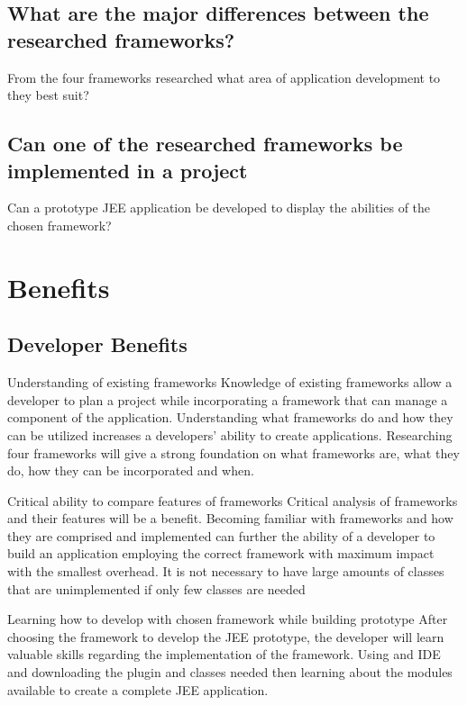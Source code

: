 \documentclass[]{report}
\begin{document}
	\subsection{What are the major differences between the researched frameworks?}
	From the four frameworks researched what area of application development to they best suit? 
	\subsection{Can one of the researched frameworks be implemented in a project}
	Can a prototype JEE application be developed to display the abilities of the chosen framework?

\newpage

\section{Benefits}
	\subsection{Developer Benefits}
	Understanding of existing frameworks\newline
	Knowledge of existing frameworks allow a developer to plan a project while incorporating a framework that can manage a component of the application. Understanding what frameworks do and how they can be utilized increases a developers’ ability to create applications. Researching four frameworks will give a strong foundation on what frameworks are, what they do, how they can be incorporated and when. 

	Critical ability to compare features of frameworks\newline
	Critical analysis of frameworks and their features will be a benefit. Becoming familiar with frameworks and how they are comprised and implemented can further the ability of a developer to build an application employing the correct framework with maximum impact with the smallest overhead. It is not necessary to have large amounts of classes that are unimplemented if only few classes are needed  

	Learning how to develop with chosen framework while building prototype\newline
	After choosing the framework to develop the JEE prototype, the developer will learn valuable skills regarding the implementation of the framework. Using and IDE and downloading the plugin and classes needed then learning about the modules available to create a complete JEE application.
\end{document}
